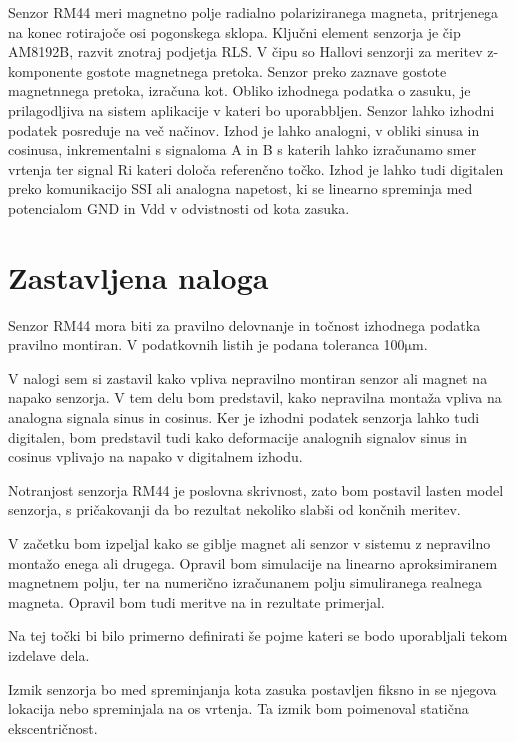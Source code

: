 Senzor RM44 meri magnetno polje radialno polariziranega magneta, pritrjenega na konec rotirajoče osi pogonskega sklopa. Ključni element senzorja je čip AM8192B, razvit znotraj podjetja RLS. V čipu so Hallovi senzorji za meritev z-komponente gostote magnetnega pretoka. Senzor preko zaznave gostote magnetnnega pretoka, izračuna kot. Obliko izhodnega podatka o zasuku, je prilagodljiva na sistem aplikacije v kateri bo uporabbljen. Senzor lahko izhodni podatek posreduje na več načinov. Izhod je lahko analogni, v obliki sinusa in cosinusa, inkrementalni s signaloma A in B s katerih lahko izračunamo smer vrtenja ter signal Ri kateri določa referenčno točko. Izhod je lahko tudi digitalen preko komunikacijo SSI ali analogna napetost, ki se linearno spreminja med potencialom GND in Vdd v odvistnosti od kota zasuka.




\chapter{Zastavljena naloga}

Senzor RM44 mora biti za pravilno delovnanje in točnost izhodnega podatka pravilno montiran. V podatkovnih listih je podana toleranca 100$\mathrm{\mu m}$. 

V nalogi sem si zastavil kako vpliva nepravilno montiran senzor ali magnet na napako senzorja. V tem delu bom predstavil, kako nepravilna montaža vpliva na analogna signala sinus in cosinus. Ker je izhodni podatek senzorja lahko tudi digitalen, bom predstavil tudi kako deformacije analognih signalov sinus in cosinus  vplivajo na napako v digitalnem izhodu.

Notranjost senzorja RM44 je poslovna skrivnost, zato bom postavil lasten model senzorja, s pričakovanji da bo rezultat nekoliko slabši od končnih meritev.

V začetku bom izpeljal kako se giblje magnet ali senzor v sistemu z nepravilno montažo enega ali drugega. Opravil bom simulacije na linearno aproksimiranem magnetnem polju, ter na numerično izračunanem polju simuliranega realnega magneta. Opravil bom tudi meritve na in rezultate primerjal.


Na tej točki bi bilo primerno definirati še pojme kateri se bodo uporabljali tekom izdelave dela.

Izmik senzorja bo med spreminjanja kota zasuka postavljen fiksno in se njegova lokacija nebo spreminjala na os vrtenja. Ta izmik bom poimenoval statična ekscentričnost.

